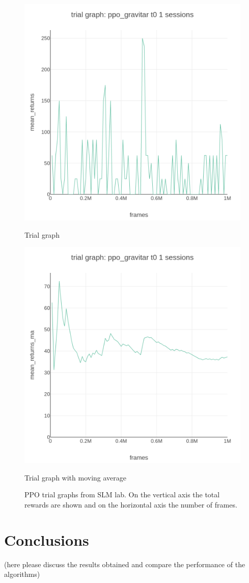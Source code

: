 \documentclass[12pt,a4paper]{report}
\begin{document}
	\begin{figure}[ht!]
		\begin{minipage}[c]{0.5\linewidth}
			\centering
			\includegraphics[height=0.3\textheight, width=0.9\linewidth]{ppo_gravitar_t0_trial_graph_mean_returns_vs_frames.png}
			\caption{Trial graph}
		\end{minipage}\hfill
		\begin{minipage}[c]{0.5\linewidth}	
			\centering
			\includegraphics[height=0.3\textheight, width=0.9\linewidth]{ppo_gravitar_t0_trial_graph_mean_returns_ma_vs_frames.png}
			\caption{Trial graph with moving average}
		\end{minipage}
		\caption{PPO trial graphs from SLM lab. On the vertical axis the total rewards are shown and on the horizontal axis the number of frames.}
	\end{figure}
	\chapter{Conclusions}
	(here please discuss the results obtained and compare the performance of the algorithms)
	
	
	
\end{document}
